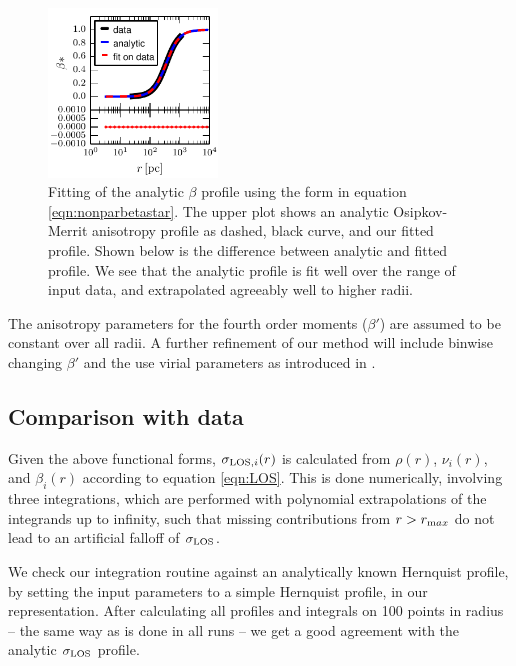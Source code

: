 \begin{figure}
    \begin{center}
        \hspace{-7mm}
        \includegraphics[width=0.4\textwidth]{fig/beta_fit_all.pdf}
        \caption{Fitting of the analytic $\beta$ profile using the form in
          equation \ref{eqn:nonparbetastar}. The upper plot shows an analytic
          Osipkov-Merrit anisotropy profile as dashed, black curve, and our
          fitted profile. Shown below is the difference between analytic and
          fitted profile. We see that the analytic profile is fit well over the
          range of input data, and extrapolated agreeably well to higher radii.}
        \label{fig:betafitting}
    \end{center}
\end{figure}

The anisotropy parameters for the fourth order moments ($\beta'$) are assumed to
be constant over all radii. A further refinement of our method will include
binwise changing $\beta'$ and the use virial parameters as introduced in
\cite{RichardsonFairbairn2014}.

\subsection{Comparison with data}\label{sec:datacompare}

Given the above functional forms, $\sigma_{\text{LOS},i}(r)$ is calculated from $\rho(r)$,
$\nu_i(r)$, and $\beta_i(r)$ according to equation \ref{eqn:LOS}. This is done
numerically, involving three integrations, which are performed with polynomial
extrapolations of the integrands up to infinity, such that missing contributions
from $r>r_{\text max}$ do not lead to an artificial falloff of $\sigma_{\text{LOS}}$.

We check our integration routine against an analytically known
Hernquist profile, by setting the input parameters to a simple
Hernquist profile, in our representation. After calculating all
profiles and integrals on 100 points in radius -- the same way as is
done in all runs -- we get a good agreement with the analytic
$\sigma_{\text{LOS}}$ profile. %

